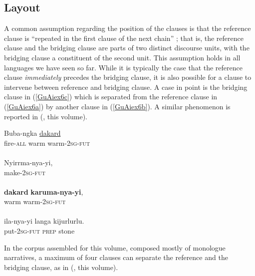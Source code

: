 \documentclass[output=paper]{LSP/langsci}
\begin{document}
\subsection{Layout}
\label{GuAi2.1layout}
A common assumption regarding the position of the clauses is that the reference clause is ``repeated in the first clause of the next chain'' \citep[][363]{devries.2005}; that is, the reference clause and the bridging clause are parts of two distinct discourse units, with the bridging clause a constituent of the second unit. This assumption holds in all languages we have seen so far. While it is typically the case that the reference clause \textit{immediately} precedes the bridging clause, it is also possible for a clause to intervene between reference and bridging clause. A case in point is the bridging clause in (\ref{GuAiex6c}) which is separated from the reference clause in (\ref{GuAiex6a}) by another clause in (\ref{GuAiex6b}). A similar phenomenon is reported in  (\citeauthor{devries18}, this volume).

\begin{exe}
	\ex	\label{GuAiex6ad}
 {\citealt[][]{Pensalfini}}
\begin{xlist}
\ex	\label{GuAiex6a}
\gll		Buba-ngka   \underline{dakard}     \underline{} \\
			fire-\textsc{all}   warm     warm-\textsc{2sg-fut}\\
		\glt	{} \\
\ex	\label{GuAiex6b}
\gll		Nyirrma-nya-yi, \\
			make-\textsc{2sg-fut} \\
		\glt	{} \\
\ex	\label{GuAiex6c}
\gll		\textbf{dakard}   \textbf{karuma-nya-yi},  \\
			warm    warm-\textsc{2sg-fut}\\
		\glt	{} \\
\ex	\label{GuAiex6d}
\gll ila-nya-yi   langa   kijurlurlu.\\
put-\textsc{2sg-fut}   \textsc{prep}   stone\\
		\glt	{} 
		\end{xlist}
\end{exe}



In the corpus assembled for this volume, composed mostly of monologue narratives, a maximum of four clauses can separate the reference and the bridging clause, as in  (\citeauthor{jarkey18}, this volume). 
\end{document}
